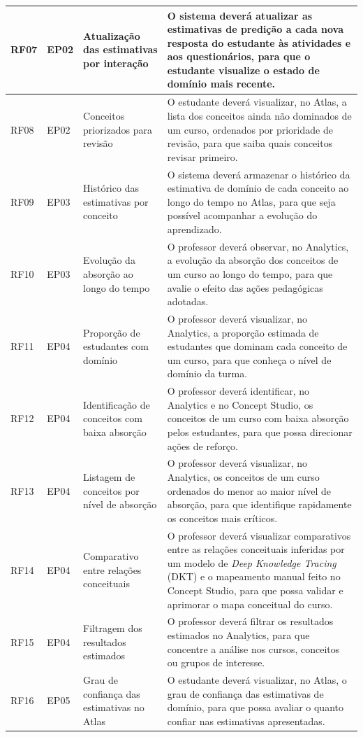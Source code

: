 {\begin{longtable}{>{\raggedright\arraybackslash}p{1.4cm}>{\raggedright\arraybackslash}p{2.0cm}>{\raggedright\arraybackslash}p{3.4cm}>{\raggedright\arraybackslash}p{7.0cm}}
\hline
RF07 & EP02 & Atualização das estimativas por interação & O sistema deverá atualizar as estimativas de predição a cada nova resposta do estudante às atividades e aos questionários, para que o estudante visualize o estado de domínio mais recente. \\
\hline
RF08 & EP02 & Conceitos priorizados para revisão & O estudante deverá visualizar, no Atlas, a lista dos conceitos ainda não dominados de um curso, ordenados por prioridade de revisão, para que saiba quais conceitos revisar primeiro. \\
\hline
RF09 & EP03 & Histórico das estimativas por conceito & O sistema deverá armazenar o histórico da estimativa de domínio de cada conceito ao longo do tempo no Atlas, para que seja possível acompanhar a evolução do aprendizado. \\
\hline
RF10 & EP03 & Evolução da absorção ao longo do tempo & O professor deverá observar, no Analytics, a evolução da absorção dos conceitos de um curso ao longo do tempo, para que avalie o efeito das ações pedagógicas adotadas. \\
\hline
RF11 & EP04 & Proporção de estudantes com domínio & O professor deverá visualizar, no Analytics, a proporção estimada de estudantes que dominam cada conceito de um curso, para que conheça o nível de domínio da turma. \\
\hline
RF12 & EP04 & Identificação de conceitos com baixa absorção & O professor deverá identificar, no Analytics e no Concept Studio, os conceitos de um curso com baixa absorção pelos estudantes, para que possa direcionar ações de reforço. \\
\hline
RF13 & EP04 & Listagem de conceitos por nível de absorção & O professor deverá visualizar, no Analytics, os conceitos de um curso ordenados do menor ao maior nível de absorção, para que identifique rapidamente os conceitos mais críticos. \\
\hline
RF14 & EP04 & Comparativo entre relações conceituais & O professor deverá visualizar comparativos entre as relações conceituais inferidas por um modelo de \textit{Deep Knowledge Tracing} (DKT) e o mapeamento manual feito no Concept Studio, para que possa validar e aprimorar o mapa conceitual do curso. \\
\hline
RF15 & EP04 & Filtragem dos resultados estimados & O professor deverá filtrar os resultados estimados no Analytics, para que concentre a análise nos cursos, conceitos ou grupos de interesse. \\
\hline
RF16 & EP05 & Grau de confiança das estimativas no Atlas & O estudante deverá visualizar, no Atlas, o grau de confiança das estimativas de domínio, para que possa avaliar o quanto confiar nas estimativas apresentadas. \\

\end{longtable}}
